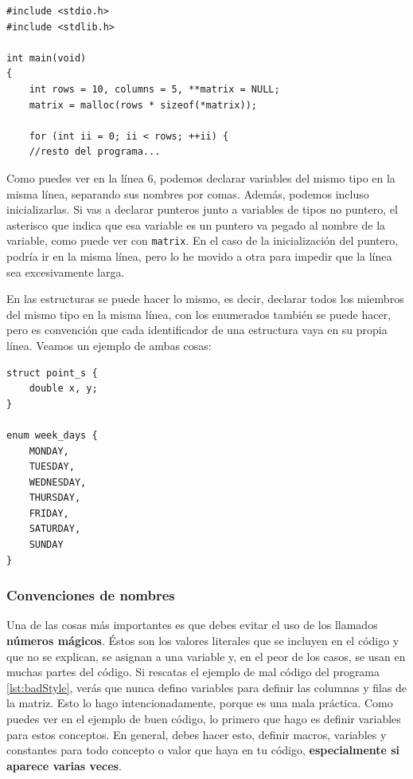 \documentclass[a4paper]{article}
\begin{document}
\noindent
\begin{minipage}[H]{\linewidth}
\mbox{}
\begin{lstlisting}[style=C,
caption={Declaración de variables en una misma línea},
label={lst:singleLineDeclaration}]
#include <stdio.h>
#include <stdlib.h>

int main(void)
{
    int rows = 10, columns = 5, **matrix = NULL;
    matrix = malloc(rows * sizeof(*matrix));

    for (int ii = 0; ii < rows; ++ii) {
    //resto del programa...
\end{lstlisting}
\end{minipage}

Como puedes ver en la línea 6, podemos declarar variables del mismo tipo
en la misma línea, separando sus nombres por comas. Además, podemos incluso
inicializarlas. Si vas a declarar punteros junto a variables de tipos no
puntero, el asterisco que indica que esa variable es un puntero va pegado al
nombre de la variable, como puede ver con \verb!matrix!. En el caso de la
inicialización del puntero, podría ir en la misma línea, pero lo he movido
a otra para impedir que la línea sea excesivamente larga.

En las estructuras se puede hacer lo mismo, es decir, declarar todos los
miembros del mismo tipo en la misma línea, con los enumerados también se puede
hacer, pero es convención que cada identificador de una estructura vaya en
su propia línea. Veamos un ejemplo de ambas cosas:

\noindent
\begin{minipage}[H]{\linewidth}
\mbox{}
\begin{lstlisting}[style=C,
caption={Declaración de miembros de un \textit{struct} en una sola línea},
label={lst:singleLineDeclarationStruct}]
struct point_s {
    double x, y;
}

enum week_days {
    MONDAY,
    TUESDAY,
    WEDNESDAY,
    THURSDAY,
    FRIDAY,
    SATURDAY,
    SUNDAY
}
\end{lstlisting}
\end{minipage}

\subsubsection{Convenciones de nombres}
Una de las cosas más importantes es que debes evitar el uso de los llamados
\textbf{números mágicos}. Éstos son los valores literales que se incluyen en
el código y que no se explican, se asignan a una variable y, en el peor de los
casos, se usan en muchas partes del código. Si rescatas el ejemplo de mal código
del programa \ref{lst:badStyle}, verás que nunca defino variables para
definir las columnas y filas de la matriz. Esto lo hago intencionadamente,
porque es una mala práctica. Como puedes ver en el ejemplo de buen código,
lo primero que hago es definir variables para estos conceptos.
En general, debes hacer esto, definir macros, variables y constantes para todo
concepto o valor que haya en tu código, \textbf{especialmente si aparece varias
veces}.
\end{document}
